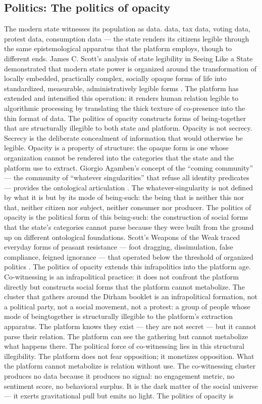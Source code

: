 \subsection{Politics: The politics of opacity}

The modern state witnesses its population as data. data, tax data, voting data, protest data, consumption data — the state renders its citizens legible through the same epistemological apparatus that the platform employs, though to different ends. James C. Scott’s analysis of state legibility in Seeing Like a State demonstrated that modern state power is organized around the transformation of locally embedded, practically complex, socially opaque forms of life into standardized, measurable, administratively legible forms \cite[pp.~1--8]{scott_1998}. The platform has extended and intensified this operation: it renders human relation legible to algorithmic processing by translating the thick texture of co-presence into the thin format of data. The politics of opacity constructs forms of being-together that are structurally illegible to both state and platform. Opacity is not secrecy. Secrecy is the deliberate concealment of information that would otherwise be legible. Opacity is a property of structure: the opaque form is one whose organization cannot be rendered into the categories that the state and the platform use to extract. Giorgio Agamben’s concept of the “coming community” — the community of “whatever singularities” that refuse all identity predicates — provides the ontological articulation \cite{agamben_1990}. The whatever-singularity is not defined by what it is but by its mode of being-such: the being that is neither this nor that, neither citizen nor subject, neither consumer nor producer. The politics of opacity is the political form of this being-such: the construction of social forms that the state’s categories cannot parse because they were built from the ground up on different ontological foundations. Scott’s Weapons of the Weak traced everyday forms of peasant resistance — foot dragging, dissimulation, false compliance, feigned ignorance — that operated below the threshold of organized politics \cite[pp.~28--47]{scott_1985}. The politics of opacity extends this infrapolitics into the platform age. Co-witnessing is an infrapolitical practice: it does not confront the platform directly but constructs social forms that the platform cannot metabolize. The cluster that gathers around the Dirham booklet is an infrapolitical formation, not a political party, not a social movement, not a protest: a group of people whose mode of beingtogether is structurally illegible to the platform’s extraction apparatus. The platform knows they exist — they are not secret — but it cannot parse their relation. The platform can see the gathering but cannot metabolize what happens there. The political force of co-witnessing lies in this structural illegibility. The platform does not fear opposition; it monetizes opposition. What the platform cannot metabolize is relation without use. The co-witnessing cluster produces no data because it produces no signal: no engagement metric, no sentiment score, no behavioral surplus. It is the dark matter of the social universe — it exerts gravitational pull but emits no light. The politics of opacity is 